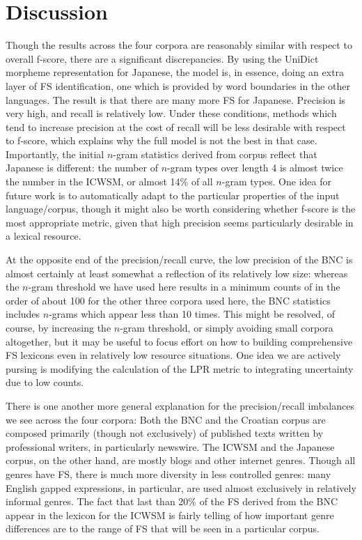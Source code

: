 \documentclass[11pt]{article}
\begin{document}
			
\section{Discussion} \label{sec:discussion}

Though the results across the four corpora are reasonably similar with respect to overall f-score, there are a significant discrepancies. By using the UniDict morpheme representation for Japanese, the model is, in essence, doing an extra layer of FS identification, one which is provided by word boundaries in the other languages. The result is that there are many more FS for Japanese. Precision is very high, and recall is relatively low. Under these conditions, methods which tend to increase precision at the cost of recall will be less desirable with respect to f-score, which explains why the full model is not the best in that case.  Importantly, the initial $n$-gram statistics derived from corpus reflect that Japanese is different: the number of $n$-gram types over length 4 is almost twice the number in the ICWSM, or almost 14\% of all $n$-gram types. One idea for future work is to automatically adapt to the particular properties of the input language/corpus, though it might also be worth considering whether f-score is the most appropriate metric, given that high precision seems particularly desirable in a lexical resource.

At the opposite end of the precision/recall curve, the low precision of the BNC is almost certainly at least somewhat a reflection of its relatively low size: whereas the $n$-gram threshold we have used here results in a minimum counts of in the order of about 100 for the other three corpora used here, the BNC statistics includes $n$-grams which appear less than 10 times. This might be resolved, of course, by increasing the $n$-gram threshold, or simply avoiding small corpora altogether, but it may be useful to focus effort on how to building comprehensive FS lexicons even in relatively low resource situations. One idea we are actively pursing is modifying the calculation of the LPR metric to integrating uncertainty due to low counts.

There is one another more general explanation for the precision/recall imbalances we see across the four corpora: Both the BNC and the Croatian corpus are composed primarily (though not exclusively) of published texts written by professional writers, in particularly newswire. The ICWSM and the Japanese corpus, on the other hand, are mostly blogs and other internet genres. Though all genres have FS, there is much more diversity in less controlled genres: many English gapped expressions, in particular, are used almost exclusively in relatively informal genres. The fact that last than 20\% of the FS derived from the BNC appear in the lexicon for the ICWSM is fairly telling of how important genre differences are to the range of FS that will be seen in a particular corpus.
\end{document}

